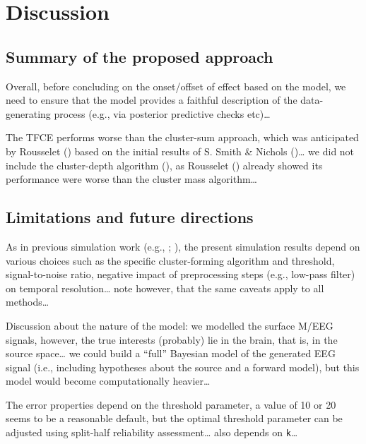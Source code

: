 \documentclass[
  doc,
  floatsintext,
  longtable,
  a4paper,
  nolmodern,
  notxfonts,
  notimes,
  donotrepeattitle,
  colorlinks=true,linkcolor=blue,citecolor=blue,urlcolor=blue]{apa7}
\begin{document}
\section{Discussion}\label{discussion}

\subsection{Summary of the proposed
approach}\label{summary-of-the-proposed-approach}

Overall, before concluding on the onset/offset of effect based on the
model, we need to ensure that the model provides a faithful description
of the data-generating process (e.g., via posterior predictive checks
etc)\ldots{}

The TFCE performs worse than the cluster-sum approach, which was
anticipated by Rousselet ()
based on the initial results of S. Smith \& Nichols
()\ldots{} we did not include the
cluster-depth algorithm (), as Rousselet () already
showed its performance were worse than the cluster mass
algorithm\ldots{}

\subsection{Limitations and future
directions}\label{limitations-and-future-directions}

As in previous simulation work (e.g.,
;
), the
present simulation results depend on various choices such as the
specific cluster-forming algorithm and threshold, signal-to-noise ratio,
negative impact of preprocessing steps (e.g., low-pass filter) on
temporal resolution\ldots{} note however, that the same caveats apply to
all methods\ldots{}

Discussion about the nature of the model: we modelled the surface M/EEG
signals, however, the true interests (probably) lie in the brain, that
is, in the source space\ldots{} we could build a ``full'' Bayesian model
of the generated EEG signal (i.e., including hypotheses about the source
and a forward model), but this model would become computationally
heavier\ldots{}

The error properties depend on the threshold parameter, a value of 10 or
20 seems to be a reasonable default, but the optimal threshold parameter
can be adjusted using split-half reliability assessment\ldots{} also
depends on \texttt{k}\ldots{}
\end{document}
